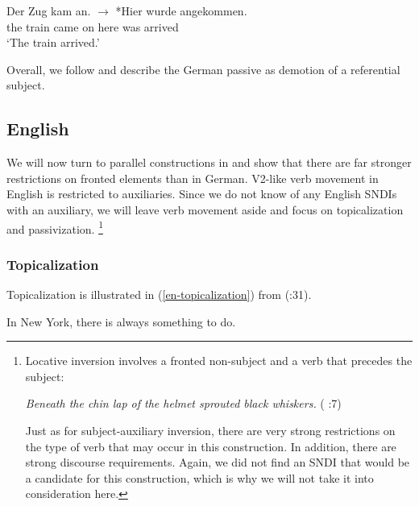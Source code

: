 \documentclass[output=paper]{langsci/langscibook}
\begin{document}
\ea
\gll Der Zug kam an. $\longrightarrow$ *Hier wurde angekommen.\\
the train came on {} here was arrived\\
\glt `The train arrived.'
\label{ankommen}
\z

Overall, we follow \cite{Mueller:13} and describe the   German passive as  demotion of a referential subject.



\subsection{English}
\label{Sec-RestrictionsEnglish}

We will now turn to  parallel constructions in  and show that there are far stronger restrictions on fronted elements than in  German. V2-like verb movement in English is restricted to auxiliaries. Since we do not know of any English SNDIs with an auxiliary, we will leave verb movement aside and focus on  topicalization and passivization.%
\footnote{Locative inversion involves a fronted non-subject and a verb that precedes the subject:

\begin{exe}\label{en-inversion}
\ex 
\textit{Beneath the chin lap of the helmet sprouted black whiskers.} (\citeauthor{Ward:Birner:94} \citeyear{Ward:Birner:94}:7)
\end{exe}

Just as for subject-auxiliary inversion, there are very strong restrictions on the type of verb that may occur in this construction. In addition, there are strong discourse requirements. Again, we did not find an SNDI that would be a candidate for this construction, which is why we will not take it into consideration here.}



\subsubsection{Topicalization}

Topicalization is illustrated in (\ref{en-topicalization}) from \citeauthor{Birner:Ward:98} (\citeyear{Birner:Ward:98}:31).

\begin{exe}
\ex\label{en-topicalization} 
In New York, there is always something to do.
\end{exe}
\end{document}
